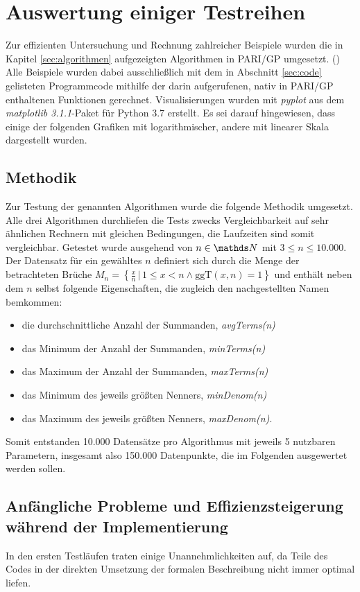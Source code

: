 \section{Auswertung einiger Testreihen}\label{sec:Testreihen}
Zur effizienten Untersuchung und Rechnung zahlreicher Beispiele wurden die in Kapitel \ref{sec:algorithmen} aufgezeigten Algorithmen in PARI/GP umgesetzt. (\cite{PARI2018})\\
Alle Beispiele wurden dabei ausschließlich mit dem in Abschnitt \ref{sec:code} gelisteten Programmcode \bzw mithilfe der darin aufgerufenen, nativ in PARI/GP enthaltenen Funktionen gerechnet.
Visualisierungen wurden mit \emph{pyplot} aus dem \emph{matplotlib 3.1.1}-Paket für Python 3.7 erstellt. Es sei darauf hingewiesen, dass einige der folgenden Grafiken mit logarithmischer, andere mit linearer Skala dargestellt wurden.

\subsection{Methodik}
Zur Testung der genannten Algorithmen wurde die folgende Methodik umgesetzt.
Alle drei Algorithmen durchliefen die Tests zwecks Vergleichbarkeit auf sehr ähnlichen Rechnern mit gleichen Bedingungen, die Laufzeiten sind somit vergleichbar.
Getestet wurde ausgehend von $n \in \N$ mit $3 \leq n \leq 10.000$.
Der Datensatz für ein gewähltes $n$ definiert sich durch die Menge der betrachteten Brüche $M_n = \left\{ \frac{x}{n} \, | \, 1\leq x < n \wedge \text{ggT}(x,n) = 1\right\}$ und enthält neben dem $n$ selbst folgende Eigenschaften, die zugleich den nachgestellten Namen bemkommen:
\begin{itemize}
	\item die durchschnittliche Anzahl der Summanden, \emph{avgTerms(n)}
	\item das Minimum der Anzahl der Summanden, \emph{minTerms(n)}
	\item das Maximum der Anzahl der Summanden, \emph{maxTerms(n)}
	\item das Minimum des jeweils größten Nenners, \emph{minDenom(n)}
	\item das Maximum des jeweils größten Nenners, \emph{maxDenom(n)}.
\end{itemize}
Somit entstanden 10.000 Datensätze pro Algorithmus mit jeweils 5 nutzbaren Parametern, insgesamt also 150.000 Datenpunkte, die im Folgenden ausgewertet werden sollen.

\subsection{Anfängliche Probleme und Effizienzsteigerung während der Implementierung}
In den ersten Testläufen traten einige Unannehmlichkeiten auf, da Teile des Codes in der direkten Umsetzung der formalen Beschreibung nicht immer optimal liefen.


